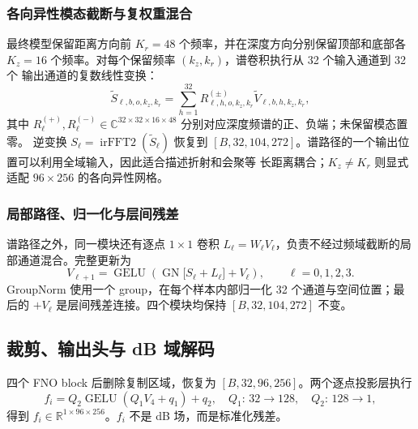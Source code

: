 \documentclass[UTF8,11pt]{ctexart}
\begin{document}
\subsubsection{各向异性模态截断与复权重混合}

最终模型保留距离方向前 $K_r=48$ 个频率，并在深度方向分别保留顶部和底部各
$K_z=16$ 个频率。对每个保留频率 $(k_z,k_r)$，谱卷积执行从 32 个输入通道到 32 个
输出通道的复数线性变换：
\begin{equation}
  \widetilde S_{\ell,b,o,k_z,k_r}
  =\sum_{h=1}^{32}R^{(\pm)}_{\ell,h,o,k_z,k_r}
  \widetilde V_{\ell,b,h,k_z,k_r},
\end{equation}
其中 $R^{(+)}_\ell,R^{(-)}_\ell\in
\mathbb{C}^{32\times32\times16\times48}$ 分别对应深度频谱的正、负端；未保留模态置零。
逆变换
$S_\ell=\operatorname{irFFT2}(\widetilde S_\ell)$ 恢复到
$[B,32,104,272]$。谱路径的一个输出位置可以利用全域输入，因此适合描述折射和会聚等
长距离耦合；$K_z\ne K_r$ 则显式适配 $96\times256$ 的各向异性网格。

\subsubsection{局部路径、归一化与层间残差}

谱路径之外，同一模块还有逐点 $1\times1$ 卷积
$L_\ell=W_\ell V_\ell$，负责不经过频域截断的局部通道混合。完整更新为
\begin{equation}
  V_{\ell+1}=\operatorname{GELU}\!\left(
  \operatorname{GN}\big[S_\ell+L_\ell\big]+V_\ell\right),
  \qquad \ell=0,1,2,3.
\end{equation}
GroupNorm 使用一个 group，在每个样本内部归一化 32 个通道与空间位置；最后的
$+V_\ell$ 是层间残差连接。四个模块均保持 $[B,32,104,272]$ 不变。

\subsection{裁剪、输出头与 dB 域解码}

四个 FNO block 后删除复制区域，恢复为 $[B,32,96,256]$。两个逐点投影层执行
\begin{equation}
  f_i=Q_2\operatorname{GELU}(Q_1V_4+q_1)+q_2,
  \quad Q_1:\,32\rightarrow128,\quad Q_2:\,128\rightarrow1,
\end{equation}
得到 $f_i\in\mathbb{R}^{1\times96\times256}$。$f_i$ 不是 dB 场，而是标准化残差。
\end{document}
